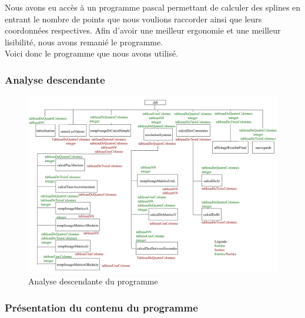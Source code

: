 \documentclass{article}
\begin{document}
Nous avons eu acc\`{e}s \`a un programme pascal permettant de calculer des splines en entrant le nombre de points que nous voulions raccorder ainsi que leurs coordonn\'{e}es respectives. Afin d'avoir une meilleur ergonomie et une meilleur lisibilit\'{e}, nous avons remani\'{e} le programme. \\ Voici donc le programme que nous avons utilis\'{e}.

\subsubsection{Analyse descendante}

\newpage
\begin{landscape}
\begin{figure}
	\centering
	\includegraphics[width=20cm]{Analyse-Descendante-Spline-Cubique.png}
	\caption{Analyse descendante du programme}
\end{figure}
\end{landscape}


\newpage
\subsubsection{Pr\'esentation du contenu du programme}
\end{document}
